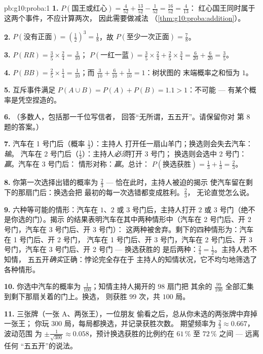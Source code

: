 \begin{solution}{pb:g10:proba:1}
\textbf{1.} $P(\text{国王或红心}) = \frac{4}{52} +
\frac{13}{52} - \frac{1}{52} = \frac{16}{52} = \frac{4}{13}$：
红心国王同时属于这两个事件，不应计算两次，
因此需要做减法
（\cref{thm:g10:proba:addition}）。

\textbf{2.} $P(\text{没有正面}) = \left(\frac12\right)^3 =
\frac18$，故 $P(\text{至少一次正面}) = \frac78$。

\textbf{3.} $P(RR) = \frac35 \times \frac24 = \frac{3}{10}$；
$P(\text{一红一蓝}) = \frac35 \times \frac24 + \frac25
\times \frac34 = \frac{6}{20} + \frac{6}{20} = \frac35$。

\textbf{4.} $P(BB) = \frac25 \times \frac14 = \frac1{10}$；而
$\frac{3}{10} + \frac{6}{10} + \frac{1}{10} = 1$：树状图的
末端概率之和恒为 $1$。

\textbf{5.} 互斥事件满足 $P(A \cup B) = P(A) +
P(B) = 1.1 > 1$：不可能 --- 有某个概率是凭空捏造的。

\textbf{6.} （多数人，包括那一千位写信者，
回答“无所谓，五五开”。请保留你对
第 8 题的答案。）

\textbf{7.} 汽车在 1 号门后（概率 $\frac13$）：主持人
打开任一扇山羊门；换选则会失去汽车：\emph{输}。
汽车在 2 号门后（$\frac13$）：主持人\emph{必须}打开 3 号门；
换选则会选中 2 号门：\emph{赢}。汽车在 3 号门后：
情形对称：\emph{赢}。总计：
$P(\text{换选获胜}) = \frac13 + \frac13 = \frac23$。

\textbf{8.} 你第一次选择出错的概率为
$\frac23$ --- 恰在此时，主持人被迫的揭示
使汽车留在剩下的那扇门后：换选会把
最初的每一次选错都变成胜利。$\frac23$，
无论直觉怎么说。

\textbf{9.} 六种等可能的情形：汽车在 $1$、$2$
或 $3$ 号门后，主持人打开 $2$ 或 $3$ 号门（绝不是你选的门）。揭示
的结果表明汽车在其中两种情形中（汽车在 2 号门后、开 2 号门，汽车在 3 号门后、开 3 号门）：
这两种被舍弃。剩下的四种情形为：汽车在 1 号门后、开 2 号门，
汽车在 1 号门后、开 3 号门，汽车在 2 号门后、开 3 号门，汽车在 3 号门后、开 2 号门 --- 换选获胜的
是后两种：$\frac24 = \frac12$。主持人若不知情，
五五开\emph{确实}正确：悖论完全存在于
主持人的知情状况，它不均匀地筛选了各种情形。

\textbf{10.} 你选中汽车的概率为
$\frac{1}{100}$；知情主持人揭开的 $98$ 扇门把
其余的 $\frac{99}{100}$ 全部汇集到剩下那扇关着的门上。换选，
则获胜 $99$ 次，共 $100$ 局。

\textbf{11.} 三张牌（一张 A、两张王），一位朋友
偷看之后，总从你未选的两张牌中弃掉一张王；
你玩 $300$ 局，每局都换选，并记录获胜次数。
期望频率为 $\frac23 \approx 0.667$，波动范围
为 $\pm\frac{1}{\sqrt{300}} \approx 0.058$，预计换选获胜的比例约在
$61\,\%$ 至 $72\,\%$ 之间 --- 远离任何
“五五开”的说法。


\end{solution}
